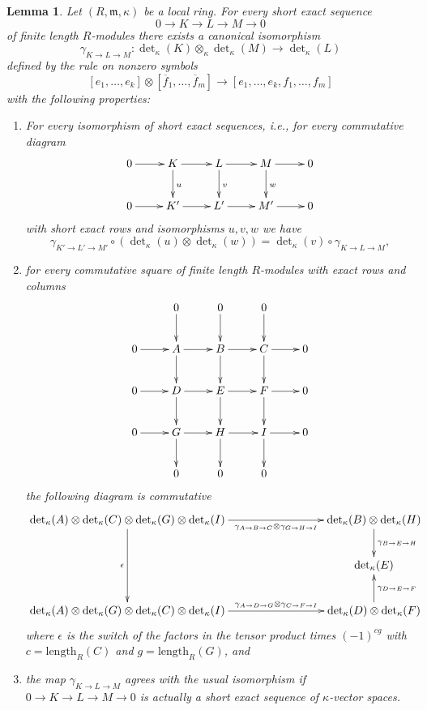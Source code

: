 \documentclass[10pt,a4paper]{amsart}
\theoremstyle{plain}
\newtheorem{lemma}[subsection]{Lemma}
\theoremstyle{definition}
\theoremstyle{remark}
\numberwithin{equation}{subsection}
\begin{document}
\begin{lemma}
\label{lemma-det-exact-sequences}
Let $(R, \mathfrak m, \kappa)$ be a local ring.
For every short exact sequence
$$
0 \to K \to L \to M \to 0
$$
of finite length $R$-modules there exists a canonical isomorphism
$$
\gamma_{K \to L \to M} :
\det\nolimits_\kappa(K) \otimes_\kappa \det\nolimits_\kappa(M)
\longrightarrow
\det\nolimits_\kappa(L)
$$
defined by the rule on nonzero symbols
$$
[e_1, \ldots, e_k]
\otimes
[\overline{f}_1, \ldots, \overline{f}_m]
\longrightarrow
[e_1, \ldots, e_k, f_1, \ldots, f_m]
$$
with the following properties:
\begin{enumerate}
\item For every isomorphism of short exact sequences, i.e., for
every commutative diagram
$$
\xymatrix{
0 \ar[r] &
K \ar[r] \ar[d]^u &
L \ar[r] \ar[d]^v &
M \ar[r] \ar[d]^w &
0 \\
0 \ar[r] &
K' \ar[r] &
L' \ar[r] &
M' \ar[r] &
0
}
$$
with short exact rows and isomorphisms $u, v, w$ we have
$$
\gamma_{K' \to L' \to M'} \circ
(\det\nolimits_\kappa(u) \otimes \det\nolimits_\kappa(w))
=
\det\nolimits_\kappa(v) \circ
\gamma_{K \to L \to M},
$$
\item for every commutative square of finite length $R$-modules
with exact rows and columns
$$
\xymatrix{
& 0 \ar[d] & 0 \ar[d] & 0 \ar[d] & \\
0 \ar[r] & A \ar[r] \ar[d] & B \ar[r] \ar[d] & C \ar[r] \ar[d] & 0 \\
0 \ar[r] & D \ar[r] \ar[d] & E \ar[r] \ar[d] & F \ar[r] \ar[d] & 0 \\
0 \ar[r] & G \ar[r] \ar[d] & H \ar[r] \ar[d] & I \ar[r] \ar[d] & 0 \\
& 0  & 0  & 0  &
}
$$
the following diagram is commutative
$$
\xymatrix{
\det\nolimits_\kappa(A) \otimes
\det\nolimits_\kappa(C) \otimes
\det\nolimits_\kappa(G) \otimes
\det\nolimits_\kappa(I)
\ar[dd]_{\epsilon}
\ar[rrr]_-{\gamma_{A \to B \to C} \otimes \gamma_{G \to H \to I}}
& & &
\det\nolimits_\kappa(B) \otimes
\det\nolimits_\kappa(H)
\ar[d]^{\gamma_{B \to E \to H}}
\\
& & & \det\nolimits_\kappa(E)
\\
\det\nolimits_\kappa(A) \otimes
\det\nolimits_\kappa(G) \otimes
\det\nolimits_\kappa(C) \otimes
\det\nolimits_\kappa(I)
\ar[rrr]^-{\gamma_{A \to D \to G} \otimes \gamma_{C \to F \to I}}
& & &
\det\nolimits_\kappa(D) \otimes
\det\nolimits_\kappa(F)
\ar[u]_{\gamma_{D \to E \to F}}
}
$$
where $\epsilon$ is the switch of the factors in the tensor product
times $(-1)^{cg}$ with $c = \text{length}_R(C)$ and $g = \text{length}_R(G)$,
and
\item the map $\gamma_{K \to L \to M}$ agrees with the usual isomorphism
if $0 \to K \to L \to M \to 0$ is actually a short exact sequence
of $\kappa$-vector spaces.
\end{enumerate}
\end{lemma}
\end{document}
